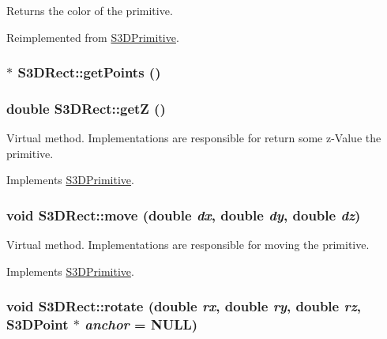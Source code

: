 Returns the color of the primitive. 



Reimplemented from \hyperlink{class_s3_d_primitive_a4102845e7754e44c51a87c0fcb391c73}{S3DPrimitive}.

\hypertarget{class_s3_d_rect_a626b39ee85c2ab329258bba6ee0ac255}{
\subsubsection[{getPoints}]{ $\ast$ S3DRect::getPoints ()}}
\label{class_s3_d_rect_a626b39ee85c2ab329258bba6ee0ac255}
\hypertarget{class_s3_d_rect_a7b3fb925a55d8a22a354829d6a5afa3d}{
\subsubsection[{getZ}]{\setlength{\rightskip}{0pt plus 5cm}double S3DRect::getZ ()}}
\label{class_s3_d_rect_a7b3fb925a55d8a22a354829d6a5afa3d}


Virtual method. Implementations are responsible for return some z-\/Value the primitive. 



Implements \hyperlink{class_s3_d_primitive_ab5b06d3a8e83216cc42554bb78afd2d9}{S3DPrimitive}.

\hypertarget{class_s3_d_rect_a97fcf9a2380d07c59bc12db8bd5949bc}{
\subsubsection[{move}]{\setlength{\rightskip}{0pt plus 5cm}void S3DRect::move (double {\em dx}, \/  double {\em dy}, \/  double {\em dz})}}
\label{class_s3_d_rect_a97fcf9a2380d07c59bc12db8bd5949bc}


Virtual method. Implementations are responsible for moving the primitive. 



Implements \hyperlink{class_s3_d_primitive_a73a178ec2e1aa8e95f01baf0552724a9}{S3DPrimitive}.

\hypertarget{class_s3_d_rect_a1d3b8406b588abf19cff5f8a6d6de2e2}{
\subsubsection[{rotate}]{\setlength{\rightskip}{0pt plus 5cm}void S3DRect::rotate (double {\em rx}, \/  double {\em ry}, \/  double {\em rz}, \/  {\bf S3DPoint} $\ast$ {\em anchor} = {\ttfamily NULL})}}
\label{class_s3_d_rect_a1d3b8406b588abf19cff5f8a6d6de2e2}


